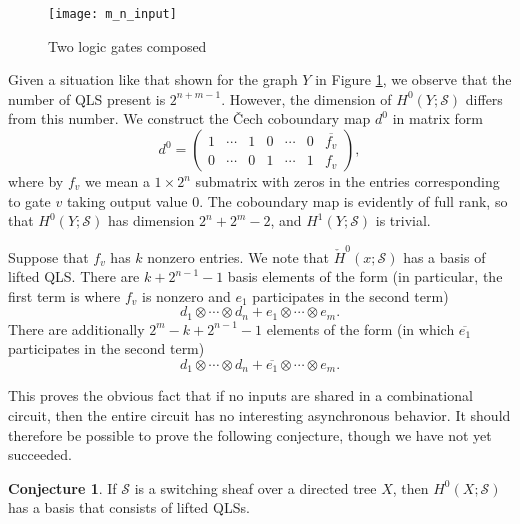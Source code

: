 \documentclass{amsart}
\theoremstyle{plain}
\theoremstyle{definition}
\newtheorem{conj}[thm]{Conjecture}
\begin{document}
\begin{figure}
\begin{center}
\texttt{[image: m\_n\_input]}
\caption{Two logic gates composed}
\label{m_n_input_fig}
\end{center}
\end{figure}

Given a situation like that shown for the graph $Y$ in Figure
\ref{m_n_input_fig}, we observe that the number of QLS present is
$2^{n+m-1}$.  However, the dimension of $H^0(Y;\mathcal{S})$ differs
from this number.  We construct the \v{C}ech coboundary map $d^0$ in matrix form
\begin{equation*}
d^0=\left(\begin{array}{cccccc|c}
1&\cdots&1&0&\cdots&0&\overline{f_v}\\
0&\cdots&0&1&\cdots&1&f_v
\end{array}\right),
\end{equation*}
where by $f_v$ we mean a $1\times 2^n$ submatrix with zeros in the
entries corresponding to gate $v$ taking output value 0.  The
coboundary map is evidently of full rank, so that $H^0(Y;\mathcal{S})$
has dimension $2^n+2^m-2$, and $H^1(Y;\mathcal{S})$ is trivial.  

Suppose that $f_v$ has $k$ nonzero entries.  We note that
$\check{H}^0(x;\mathcal{S})$ has a basis of lifted QLS.  There are $k+2^{n-1}-1$ basis
elements of the form (in particular, the first term is where $f_v$ is
nonzero and $e_1$ participates in the second term)
\begin{equation*}
d_1 \otimes \cdots \otimes d_n + e_1 \otimes \cdots \otimes e_m.
\end{equation*}
There are additionally $2^m-k+2^{n-1}-1$ elements of the form (in which
$\overline{e_1}$ participates in the second term)
\begin{equation*}
d_1 \otimes \cdots \otimes d_n + \overline{e_1} \otimes \cdots \otimes
e_m.
\end{equation*}

This proves the obvious fact that if no inputs are shared in a
combinational circuit, then the entire circuit has no interesting
asynchronous behavior.  It should therefore be possible to prove the
following conjecture, though we have not yet succeeded.

\begin{conj}
\label{dag_conj}
If $\mathcal{S}$ is a switching sheaf over a directed tree $X$,
then $H^0(X;\mathcal{S})$ has a basis that consists of lifted QLSs.
\end{conj}
\end{document}
